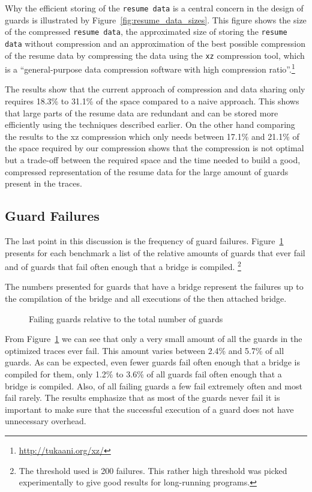 \documentclass[10pt,preprint]{sigplanconf}
\begin{document}
Why the efficient storing of the \texttt{resume data} is a central concern in the design
of guards is illustrated by Figure~\ref{fig:resume_data_sizes}. This figure shows
the size of the compressed \texttt{resume data}, the approximated size of
storing the \texttt{resume data} without compression and
an approximation of the best possible compression of the resume data by
compressing the data using the
\texttt{xz} compression tool, which is a ``general-purpose data compression
software with high compression ratio''.\footnote{\url{http://tukaani.org/xz/}}

The results show that the current approach of compression and data sharing only
requires 18.3\% to 31.1\% of the space compared to a naive approach. This
shows that large parts of the resume data are redundant and can be stored more
efficiently using the techniques described earlier. On the other hand
comparing the results to the xz compression which only needs between 17.1\%
and 21.1\% of the space required by our compression shows that the compression
is not optimal but a trade-off between the required space and the time needed
to build a good, compressed representation of the resume data for the
large amount of guards present in the traces.

\subsection{Guard Failures}
\label{sub:guard_failure}
The last point in this discussion is the frequency of guard failures.
Figure~\ref{fig:failing_guards} presents for each benchmark a list of the
relative amounts of guards that ever fail and of guards that fail often enough that a bridge is compiled.
\footnote{
    The threshold used is 200 failures. This rather high threshold was picked experimentally to give
    good results for long-running programs.
}

The numbers presented for guards that have a bridge represent the
failures up to the compilation of the bridge and all executions of the then
attached bridge.

\begin{figure}
    
    \caption{Failing guards relative to the total number of guards}
    \label{fig:failing_guards}
\end{figure}

From Figure~\ref{fig:failing_guards} we can see that only a very small amount
of all the guards in the optimized traces ever fail. This amount varies between
2.4\% and 5.7\% of all guards. As can be expected, even fewer guards fail often
enough that a bridge is compiled for them, only 1.2\% to 3.6\% of all guards
fail often enough that a bridge is compiled. Also, of all failing guards a few fail extremely often
and most fail rarely. The results emphasize that as most of the guards never
fail it is important to make sure that the successful execution of a guard does
not have unnecessary overhead.
\end{document}
